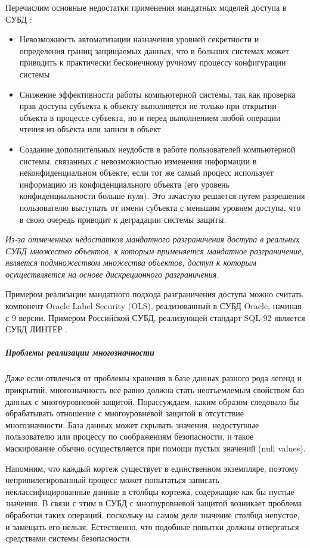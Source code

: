 Перечислим основные недостатки применения мандатных моделей доступа в СУБД \autocite{Skakun}:
\begin{itemize}
    \item Невозможность автоматизации назначения уровней секретности и определения границ защищаемых данных,
    что в больших системах может приводить к практически бесконечному ручному процессу конфигурации системы
    \item Снижение эффективности работы компьютерной системы, так как проверка прав доступа субъекта к объекту
    выполняется не только при открытии объекта в процессе субъекта, но и перед выполнением любой операции
    чтения из объекта или записи в объект
    \item Создание дополнительных неудобств в работе пользователей компьютерной системы, связанных с
    невозможностью изменения информации в неконфиденциальном объекте, если тот же самый процесс использует
    информацию из конфиденциального объекта (его уровень конфиденциальности больше нуля). Это зачастую
    решается путем разрешения пользователю выступать от имени субъекта с меньшим уровнем доступа, что в
    свою очередь приводит к деградации системы защиты.
\end{itemize}

\textit{Из-за отмеченных недостатков мандатного разграничения доступа в реальных СУБД множество объектов, к которым
применяется мандатное разграничение, является подмножеством множества объектов, доступ к которым осуществляется
на основе дискреционного разграничения.}

Примером реализации мандатного подхода разграничения доступа можно считать компонент Oracle Label Security (OLS),
реализованный в СУБД Oracle, начиная с 9 версии. Примером Российской СУБД, реализующей стандарт SQL-92 является
СУБД ЛИНТЕР \autocite{Skakun}.

\subparagraph{Проблемы реализации многозначности}

Даже если отвлечься от проблемы хранения в базе данных разного рода легенд и прикрытий, многозначность все равно должна стать неотъемлемым свойством баз данных с многоуровневой защитой. Порассуждаем, каким образом следовало бы обрабатывать отношение с многоуровневой защитой в отсутствие многозначности. База данных может скрывать значения, недоступные пользователю или процессу по соображениям безопасности, и такое маскирование обычно осуществляется при помощи пустых значений (null values).

Напомним, что каждый кортеж существует в единственном экземпляре, поэтому непривилегированный процесс может попытаться записать неклассифицированные данные в столбцы кортежа, содержащие как бы пустые значения. В связи с этим в СУБД с многоуровневой защитой возникает проблема обработки таких операций, поскольку на самом деле значение столбца непустое, и замещать его нельзя. Естественно, что подобные попытки должны отвергаться средствами системы безопасности.

